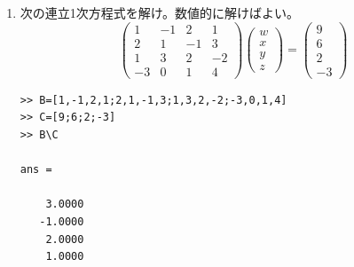 \documentclass[dvipdfmx]{jsarticle}
\begin{document}
\begin{enumerate}[(1)]
\begin{verbatim}
ans =

     4

>> det(A)

ans =

   0.0000 -16.0000i

>> inv(A)

ans =

   0.2500 + 0.0000i   0.2500 + 0.0000i   0.2500 + 0.0000i   0.2500 + 0.0000i
   0.2500 + 0.0000i   0.0000 - 0.2500i  -0.2500 + 0.0000i   0.0000 + 0.2500i
   0.2500 + 0.0000i  -0.2500 + 0.0000i   0.2500 + 0.0000i  -0.2500 + 0.0000i
   0.2500 + 0.0000i   0.0000 + 0.2500i  -0.2500 + 0.0000i   0.0000 - 0.2500i


\end{verbatim}
\item
次の連立1次方程式を解け。数値的に解けばよい。
\[
\left(\begin{array}{cccc}
 1 & -1 &  2 &  1 \\
 2 &  1 & -1 &  3 \\
 1 &  3 &  2 & -2 \\
-3 &  0 &  1 &  4
\end{array}\right)
\left(\begin{array}{c}
w \\
x \\
y \\
z
\end{array}\right)
=
\left(\begin{array}{c}
9 \\
6 \\
2 \\
-3
\end{array}\right)
\]
\begin{verbatim}
>> B=[1,-1,2,1;2,1,-1,3;1,3,2,-2;-3,0,1,4]
>> C=[9;6;2;-3]
>> B\C                                    

ans =

    3.0000
   -1.0000
    2.0000
    1.0000


\end{verbatim}
\end{enumerate}
\end{document}
